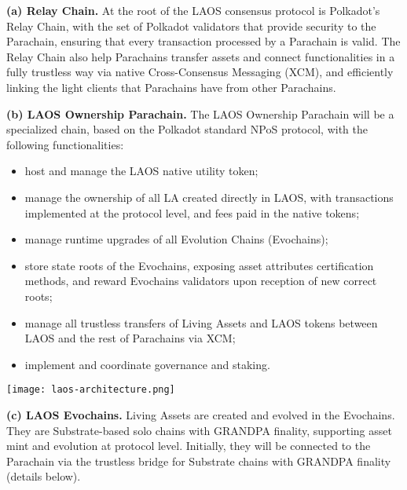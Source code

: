 \vspace{\baselineskip}

{\bf (a) Relay Chain.}
At the root of the LAOS consensus protocol is Polkadot's Relay Chain, with the set 
of Polkadot validators that provide security to the Parachain, ensuring that
every transaction processed by a Parachain is valid. The Relay Chain
also help Parachains transfer assets and connect functionalities in a fully
trustless way via native Cross-Consensus Messaging (XCM), and efficiently 
linking the light clients that Parachains have from other Parachains.

\vspace{\baselineskip}

{\bf (b) LAOS Ownership Parachain.}
The LAOS Ownership Parachain will be a specialized chain, based on the 
Polkadot standard NPoS protocol, with the following functionalities:
\begin{itemize}
    \item host and manage the LAOS native utility token;
    \item manage the ownership of all LA created directly in LAOS, with 
    transactions implemented at the protocol level,
    and fees paid in the native tokens;
    \item manage runtime upgrades of all Evolution Chains (Evochains);
    \item store state roots of the Evochains, exposing asset attributes
    certification methods,
    and reward Evochains validators upon reception of new correct roots;
    \item manage all trustless transfers of Living Assets and LAOS tokens
    between LAOS and the rest of Parachains via XCM;
    \item implement and coordinate governance and staking.
\end{itemize}

\begin{Figure}
    \medskip
    \texttt{[image: laos-architecture.png]}
    \medskip
    \label{fig:architecture}
\end{Figure}


\vspace{\baselineskip}

{\bf (c) LAOS Evochains.}
Living Assets are created and evolved in the Evochains.
They are Substrate-based solo chains with GRANDPA finality,
supporting asset mint and evolution at protocol level.
Initially, they will be connected to the Parachain
via the trustless bridge for Substrate chains with GRANDPA finality (details below).


